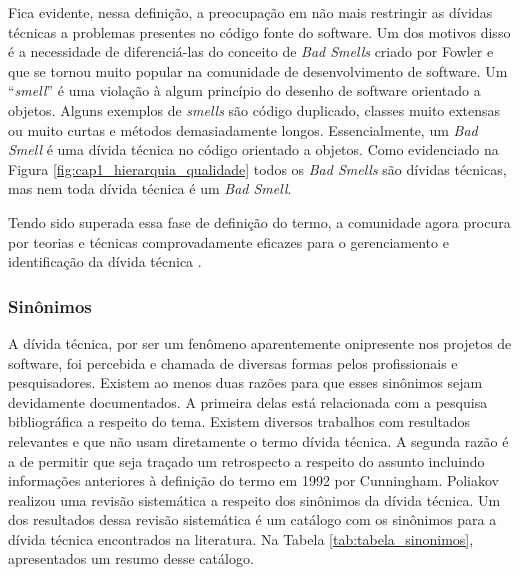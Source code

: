 
Fica evidente, nessa definição, a preocupação em não mais restringir as dívidas técnicas a problemas  presentes no código fonte do software. Um dos motivos disso é a necessidade de diferenciá-las do conceito de \textit{Bad Smells} criado por Fowler\cite{fowler2009refactoring} e que se tornou muito popular na comunidade de desenvolvimento de software\cite{olbrich2009evolution}. Um ``\textit{smell}'' é uma violação à algum princípio do desenho de software orientado a objetos. Alguns exemplos de \textit{smells} são código duplicado, classes muito extensas ou muito curtas e métodos demasiadamente longos\cite{van2002java}. Essencialmente, um \textit{Bad Smell} é uma dívida técnica no código orientado a objetos\cite{poliakov2015systematic}. Como evidenciado na Figura \ref{fig:cap1_hierarquia_qualidade} todos os \textit{Bad Smells} são dívidas técnicas, mas nem toda dívida técnica é um \textit{Bad Smell}.


Tendo sido superada essa fase de definição do termo, a comunidade agora procura por teorias e técnicas comprovadamente eficazes para o gerenciamento e identificação da dívida técnica \cite{falessi2014technical}.





\subsubsection{Sinônimos}

A dívida técnica, por ser um fenômeno aparentemente onipresente nos projetos de software\cite{lim2012balancing,brown2010managing}, foi percebida e chamada de diversas formas pelos profissionais e pesquisadores. Existem ao menos duas razões para que esses sinônimos sejam devidamente documentados. A primeira delas está relacionada com a pesquisa bibliográfica a respeito do tema. Existem diversos trabalhos com resultados relevantes e que não usam diretamente o termo dívida técnica\cite{fowler2018refactoring,lanning1994modeling,lindgren2012bridging,smit2011code}. A segunda razão é a de permitir que seja traçado um retrospecto a respeito do assunto incluindo informações anteriores à definição do termo em 1992 por Cunningham\cite{cunningham1993wycash}. Poliakov realizou uma revisão sistemática a respeito dos sinônimos da dívida técnica\cite{poliakov2015systematic}. Um dos resultados dessa revisão sistemática é um catálogo com os sinônimos para a dívida técnica encontrados na literatura. Na Tabela \ref{tab:tabela_sinonimos}, apresentados um resumo desse catálogo.

